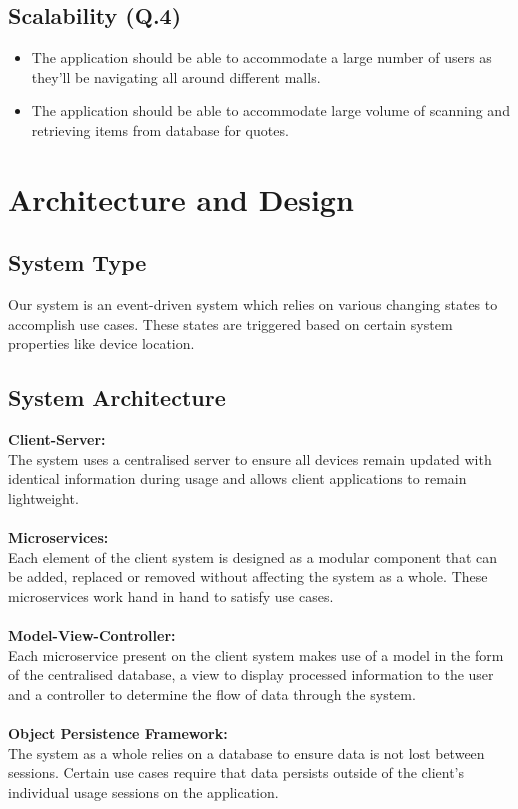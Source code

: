 \documentclass{article}
\begin{document}
    \subsection{Scalability (Q.4)}
    \begin{itemize}
        \item The application should be able to accommodate a large number of users as they'll be navigating all around different malls.
        \item The application should be able to accommodate large volume of scanning and retrieving items from database for quotes.
    \end{itemize}
    
\section{Architecture and Design}

\subsection{System Type}
\noindent Our system is an event-driven system which relies on various changing states to accomplish use cases. These states are triggered based on certain system properties like device location.

\subsection{System Architecture}
\noindent\textbf{Client-Server:}\\
The system uses a centralised server to ensure all devices remain updated with identical information during usage and allows client applications to remain lightweight.\\\\
\noindent\textbf{Microservices:}\\
Each element of the client system is designed as a modular component that can be added, replaced or removed without affecting the system as a whole. These microservices work hand in hand to satisfy use cases.\\\\
\noindent\textbf{Model-View-Controller:}\\
Each microservice present on the client system makes use of a model in the form of the centralised database, a view to display processed information to the user and a controller to determine the flow of data through the system.\\\\
\noindent\textbf{Object Persistence Framework:}\\
The system as a whole relies on a database to ensure data is not lost between sessions. Certain use cases require that data persists outside of the client's individual usage sessions on the application.
\end{document}
